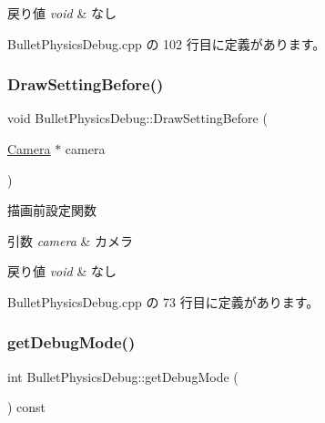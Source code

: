 \begin{DoxyRetVals}{戻り値}
{\em void} & なし \\
\hline
\end{DoxyRetVals}


 Bullet\+Physics\+Debug.\+cpp の 102 行目に定義があります。

\mbox{\label{class_bullet_physics_debug_ac88494485e3532fcb79c56a715dfa737}} 
\subsubsection{\texorpdfstring{Draw\+Setting\+Before()}{DrawSettingBefore()}}
{\footnotesize\ttfamily void Bullet\+Physics\+Debug\+::\+Draw\+Setting\+Before (\begin{DoxyParamCaption}\item[{\mbox{\hyperlink{class_camera}{Camera}} $\ast$}]{camera }\end{DoxyParamCaption})}



描画前設定関数 


\begin{DoxyParams}{引数}
{\em camera} & カメラ \\
\hline
\end{DoxyParams}

\begin{DoxyRetVals}{戻り値}
{\em void} & なし \\
\hline
\end{DoxyRetVals}


 Bullet\+Physics\+Debug.\+cpp の 73 行目に定義があります。

\mbox{\label{class_bullet_physics_debug_a6b75505ddd99b72ab6d72658a835419f}} 
\subsubsection{\texorpdfstring{get\+Debug\+Mode()}{getDebugMode()}}
{\footnotesize\ttfamily int Bullet\+Physics\+Debug\+::get\+Debug\+Mode (\begin{DoxyParamCaption}{ }\end{DoxyParamCaption}) const\hspace{0.3cm}{\ttfamily [override]}}



